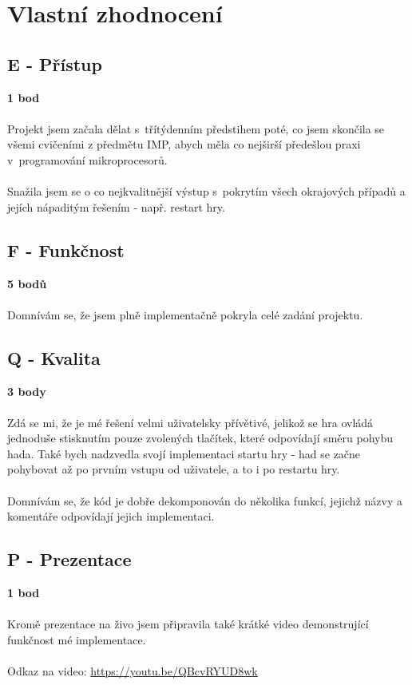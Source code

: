 \documentclass[]{fitiel} %
\begin{document}
    \newpage
    \section{Vlastní zhodnocení}
    \subsection{E - Přístup}
    \textbf{1 bod}
    \\\\
    Projekt jsem začala dělat s~třítýdenním předstihem poté, co jsem skončila se všemi cvičeními z předmětu IMP, abych měla co nejširší předešlou praxi v~programování mikroprocesorů. 
    \\\\
    Snažila jsem se o co nejkvalitnější výstup s~pokrytím všech okrajových případů a jejích nápaditým řešením - např. restart hry.
    \subsection{F - Funkčnost}
    \textbf{5 bodů}
    \\\\
    Domnívám se, že jsem plně implementačně pokryla celé zadání projektu.
    \subsection{Q - Kvalita}
    \textbf{3 body}
    \\\\
    Zdá se mi, že je mé řešení velmi uživatelsky přívětivé, jelikož se hra ovládá jednoduše stisknutím pouze zvolených tlačítek, které odpovídají směru pohybu hada. Také bych nadzvedla svojí implementaci startu hry - had se začne pohybovat až po prvním vstupu od uživatele, a to i po restartu hry.
    \\\\
    Domnívám se, že kód je dobře dekomponován do několika funkcí, jejichž názvy a komentáře odpovídají jejich implementaci.
    \subsection{P - Prezentace}
    \textbf{1 bod}
    \\\\
    Kromě prezentace na živo jsem připravila také krátké video demonstrující funkčnost mé implementace.
    \\\\
    Odkaz na video: \href{https://youtu.be/QBcvRYUD8wk}{https://youtu.be/QBcvRYUD8wk} 
\end{document}
